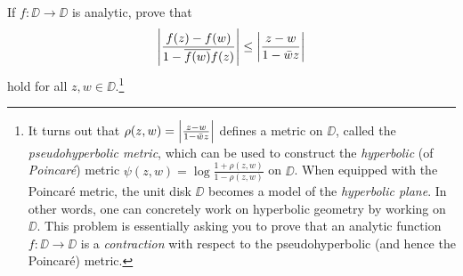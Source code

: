 \documentclass{../math135}
\begin{document}
\begin{exercise}
	If \(f \colon \DD \to \DD\) is analytic, prove that
  \[
		\abs*{\frac{f(z) - f(w)}{1 - \overline{f(w)} f(z)}} \le
    \abs*{\frac{z-w}{1 - \bar w z}}
  \]
	hold for all \(z, w \in \DD\).\footnote{It turns out that
    \(\rho(z, w) = \abs*{\frac{z-w}{1 - \bar w z}}\) defines a metric
    on \(\DD\), called the \emph{pseudohyperbolic metric}, which can
    be used to construct the \emph{hyperbolic} (of \emph{Poincar\'e})
    metric \(\psi(z, w) = \log \frac{1 + \rho(z,w)}{1 - \rho(z,w)}\)
    on \(\DD\).  When equipped with the Poincar\'e metric, the unit
    disk \(\DD\) becomes a model of the \emph{hyperbolic plane}.  In
    other words, one can concretely work on hyperbolic geometry by
    working on \(\DD\).  This problem is essentially asking you to
    prove that an analytic function \(f \colon \DD \to \DD\) is a
    \emph{contraction} with respect to the pseudohyperbolic (and hence
    the Poincar\'e) metric.}
\end{exercise}
\end{document}
